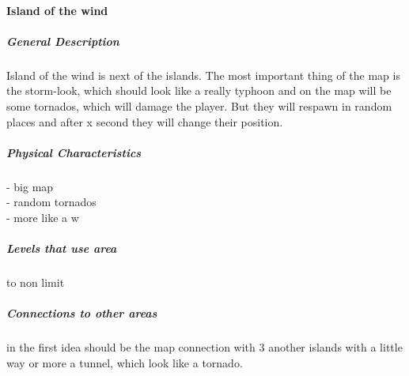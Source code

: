 \documentclass[parskip=full]{scrartcl}
\begin{document}
					\paragraph{Island of the wind}\vspace{-0.5cm}
							\subparagraph{General Description} \vspace{-0.5cm}
							\par \begingroup
							\leftskip=2cm
							\noindent
									Island of the wind is next of the islands. The most important thing of the map is the storm-look, which should look like a really typhoon and on the map will be some tornados, which will damage the player. But they will respawn in random places and after x second they will change their  position. 
							\par \endgroup
						\subparagraph{Physical Characteristics} \vspace{-0.5cm}
							\par \begingroup
							\leftskip=2cm
							\noindent
									- big map \\
									- random tornados \\
									- more like a w
							\par \endgroup
						\subparagraph{Levels that use area} \vspace{-0.5cm}
							\par \begingroup
							\leftskip=2cm
							 to non limit
							\par \endgroup
						\subparagraph{Connections to other areas} \vspace{-0.5cm}
							\par \begingroup
							\leftskip=2cm
							\noindent
									in the first idea should be the map connection with 3 another islands with a little way or more a tunnel, which look like a tornado.
							\par \endgroup
\end{document}
